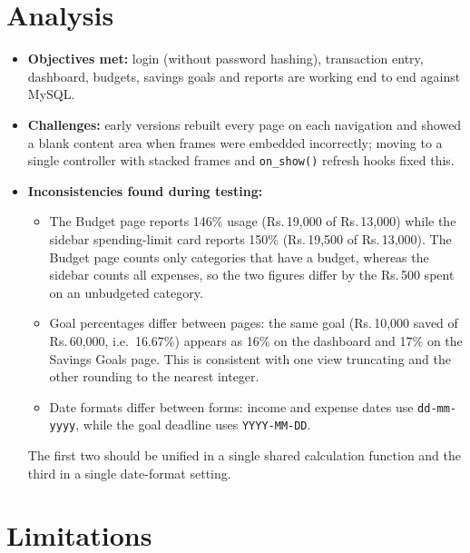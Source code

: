 \documentclass{tietreport}
\begin{document}
\section{Analysis}
\label{sec:analysis}

\begin{itemize}
  \item \textbf{Objectives met:} login (without password hashing),
    transaction entry, dashboard, budgets, savings goals and
    reports are working end to end against MySQL.
  \item \textbf{Challenges:} early versions rebuilt every page on
    each navigation and showed a blank content area when frames
    were embedded incorrectly; moving to a single controller with
    stacked frames and \texttt{on\_show()} refresh hooks fixed this.
  \item \textbf{Inconsistencies found during testing:}
    \begin{itemize}
      \item The Budget page reports 146\% usage (Rs.\,19,000 of
        Rs.\,13,000) while the sidebar spending-limit card reports
        150\% (Rs.\,19,500 of Rs.\,13,000). The Budget page counts
        only categories that have a budget, whereas the sidebar
        counts all expenses, so the two figures differ by the
        Rs.\,500 spent on an unbudgeted category.
      \item Goal percentages differ between pages: the same goal
        (Rs.\,10,000 saved of Rs.\,60,000, i.e.\ 16.67\%) appears as
        16\% on the dashboard and 17\% on the Savings Goals page.
        This is consistent with one view truncating and the other
        rounding to the nearest integer.
      \item Date formats differ between forms: income and expense
        dates use \texttt{dd-mm-yyyy}, while the goal deadline uses
        \texttt{YYYY-MM-DD}.
    \end{itemize}
    The first two should be unified in a single shared calculation
    function and the third in a single date-format setting.
\end{itemize}

\section{Limitations}
\label{sec:limitations}
\end{document}
